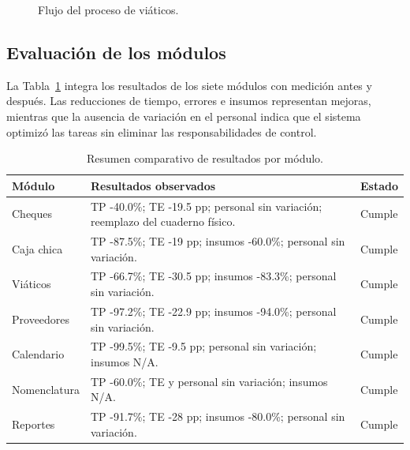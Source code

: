 \begin{figure}[H]
\centering
\caption{Flujo del proceso de viáticos.}\label{fig:cap5_flujo_viaticos}
\end{figure}

\subsection{Evaluación de los módulos}

La Tabla~\ref{tab:cap5_resumen} integra los resultados de los siete módulos con medición antes y después. Las reducciones de tiempo, errores e insumos representan mejoras, mientras que la ausencia de variación en el personal indica que el sistema optimizó las tareas sin eliminar las responsabilidades de control.

\begin{table}[H]\centering
\caption{Resumen comparativo de resultados por módulo.}\label{tab:cap5_resumen}
\begingroup\small\setlength{\tabcolsep}{3pt}
\begin{tabularx}{0.96\linewidth}{@{}p{2.7cm}X p{1.7cm}@{}}
\toprule
\textbf{Módulo} & \textbf{Resultados observados} & \textbf{Estado}\\
\midrule
Cheques & TP -40.0\%; TE -19.5 pp; personal sin variación; reemplazo del cuaderno físico. & Cumple\\
Caja chica & TP -87.5\%; TE -19 pp; insumos -60.0\%; personal sin variación. & Cumple\\
Viáticos & TP -66.7\%; TE -30.5 pp; insumos -83.3\%; personal sin variación. & Cumple\\
Proveedores & TP -97.2\%; TE -22.9 pp; insumos -94.0\%; personal sin variación. & Cumple\\
Calendario & TP -99.5\%; TE -9.5 pp; personal sin variación; insumos N/A. & Cumple\\
Nomenclatura & TP -60.0\%; TE y personal sin variación; insumos N/A. & Cumple\\
Reportes & TP -91.7\%; TE -28 pp; insumos -80.0\%; personal sin variación. & Cumple\\
\bottomrule
\end{tabularx}\endgroup
\end{table}


